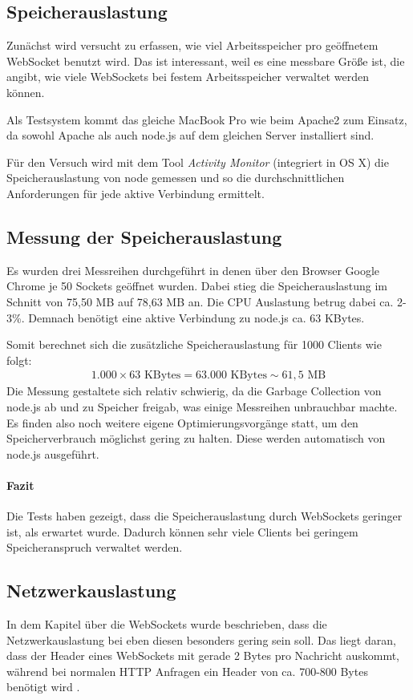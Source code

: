 \subsection{Speicherauslastung}
Zunächst wird versucht zu erfassen, wie viel Arbeitsspeicher pro geöffnetem WebSocket benutzt wird. Das ist interessant, weil es eine messbare Größe ist, die angibt, wie viele WebSockets bei festem Arbeitsspeicher verwaltet werden können.\par

Als Testsystem kommt das gleiche MacBook Pro wie beim Apache2 zum Einsatz, da sowohl Apache als auch node.js auf dem gleichen Server installiert sind.

\newpage
Für den Versuch wird mit dem Tool \emph{Activity Monitor} (integriert in OS X) die Speicherauslastung von node gemessen und so die durchschnittlichen Anforderungen für jede aktive Verbindung ermittelt.

\subsection{Messung der Speicherauslastung}
Es wurden drei Messreihen durchgeführt in denen über den Browser Google Chrome je 50 Sockets geöffnet wurden. Dabei stieg die Speicherauslastung im Schnitt von 75,50 MB auf 78,63 MB an. Die CPU Auslastung betrug dabei ca. 2-3\%. Demnach benötigt eine aktive Verbindung zu node.js ca. 63 KBytes.\par

Somit berechnet sich die zusätzliche Speicherauslastung für 1000 Clients wie folgt:
\begin{align*}
	1.000 \times 63 \mbox{ KBytes} = 63.000 \mbox{ KBytes} \sim 61,5 \mbox{ MB}
\end{align*}
Die Messung gestaltete sich relativ schwierig, da die Garbage Collection von node.js ab und zu Speicher freigab, was einige Messreihen unbrauchbar machte. Es finden also noch weitere eigene Optimierungsvorgänge statt, um den Speicherverbrauch möglichst gering zu halten. Diese werden automatisch von node.js ausgeführt.

\paragraph{Fazit}
Die Tests haben gezeigt, dass die Speicherauslastung durch WebSockets geringer ist, als erwartet wurde. Dadurch können sehr viele Clients bei geringem Speicheranspruch verwaltet werden.

\subsection{Netzwerkauslastung}
In dem Kapitel über die WebSockets wurde beschrieben, dass die Netzwerkauslastung bei eben diesen besonders gering sein soll. Das liegt daran, dass der Header eines WebSockets mit gerade 2 Bytes pro Nachricht auskommt, während bei normalen HTTP Anfragen ein Header von ca. 700-800 Bytes benötigt wird \cite{chromium:headers}.\par

